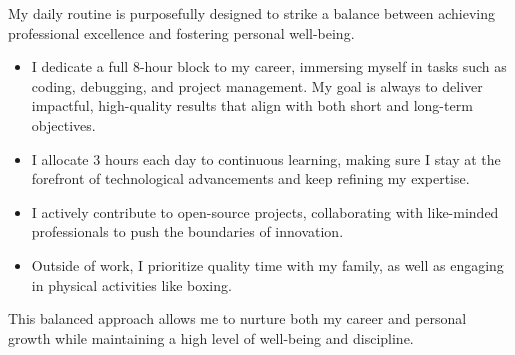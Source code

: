 

\divider

My daily routine is purposefully designed to strike a balance between achieving professional excellence and fostering personal well-being.


\begin{itemize}

  \item {} I dedicate a full 8-hour block to my career, immersing myself in tasks such as coding, debugging, and project management. My goal is always to deliver impactful, high-quality results that align with both short and long-term objectives.

  \item {} I allocate 3 hours each day to continuous learning, making sure I stay at the forefront of technological advancements and keep refining my expertise.

  \item {} I actively contribute to open-source projects, collaborating with like-minded professionals to push the boundaries of innovation.

  \item {} Outside of work, I prioritize quality time with my family, as well as engaging in physical activities like boxing.

\end{itemize}

This balanced approach allows me to nurture both my career and personal growth while maintaining a high level of well-being and discipline.